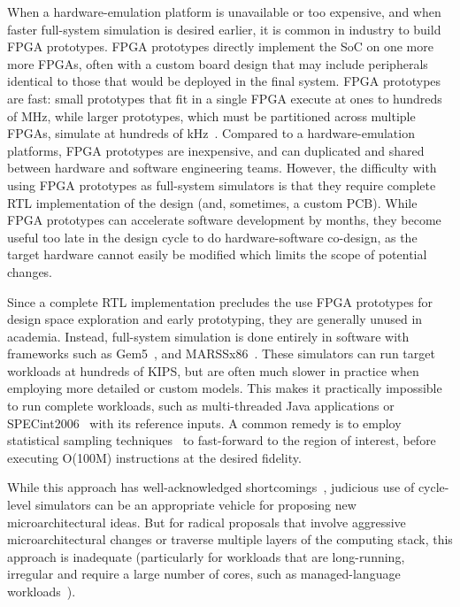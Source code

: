 When a hardware-emulation platform is unavailable or too expensive, and when
faster full-system simulation is desired earlier, it is common in industry to
build FPGA prototypes. FPGA prototypes directly implement the SoC on one more
more FPGAs, often with a custom board design that may include peripherals
identical to those that would be deployed in the final system.  FPGA prototypes
are fast: small prototypes that fit in a single FPGA execute at ones to hundreds of
MHz, while larger prototypes, which must be partitioned across multiple FPGAs,
simulate at hundreds of kHz~\cite{nehalemprototype, atomprototype}.  Compared to
a hardware-emulation platforms, FPGA prototypes are inexpensive, and can duplicated and
shared between hardware and software engineering teams. However, the difficulty with
using FPGA prototypes as full-system simulators is that they require complete
RTL implementation of the design (and, sometimes, a custom PCB). While
FPGA prototypes can accelerate software development by months, they become
useful too late in the design cycle to do hardware-software co-design, as the
target hardware cannot easily be modified which limits the scope of potential
changes.

Since a complete RTL implementation precludes the use FPGA prototypes for
design space exploration and early prototyping, they are generally unused in
academia. Instead, full-system simulation is done entirely in software with
frameworks such as Gem5~\cite{gem5}, and MARSSx86~\cite{marssx86}.
These simulators can run target workloads at hundreds of KIPS, but are
often much slower in practice when employing more detailed or custom models. This
makes it practically impossible to run complete workloads, such as
multi-threaded Java applications or SPECint2006~\cite{spec} with its reference
inputs. A common remedy is to employ statistical sampling
techniques~\cite{smarts} to fast-forward to the region of interest, before
executing O(100M) instructions at the desired fidelity.

While this approach has well-acknowledged shortcomings~\cite{gem5error},
judicious use of cycle-level simulators can be an appropriate vehicle for
proposing new microarchitectural ideas. But for radical proposals that involve
aggressive microarchitectural changes or traverse multiple layers of the
computing stack, this approach is inadequate (particularly for workloads that
are long-running, irregular and require a large number of cores, such as
managed-language workloads~\cite{MicroSimPanel}). 

